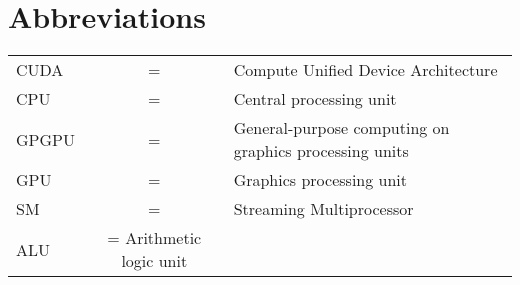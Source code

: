 
\section*{{\Huge Abbreviations}}
\vspace{1 cm}

\noindent
\begin{center}
\begin{tabular}{ l c l }
   CUDA & = & Compute Unified Device Architecture \\
   CPU & = & Central processing unit \\
   GPGPU & = & General-purpose computing on graphics processing units \\
   GPU & = & Graphics processing unit \\
   SM & = & Streaming Multiprocessor \\
   ALU & = Arithmetic logic unit \\
\end{tabular}
\end{center}

\cleardoublepage

\pagestyle{fancy}
\fancyhf{}
\renewcommand{\chaptermark}[1]{\markboth{\chaptername\ \thechapter.\ #1}{}}
\renewcommand{\sectionmark}[1]{\markright{\thesection\ #1}}
\renewcommand{\headrulewidth}{0.1ex}
\renewcommand{\footrulewidth}{0.1ex}
\fancyfoot[LE,RO]{\thepage}
\fancyhead[LE]{\leftmark}
\fancyhead[RO]{\rightmark}
\fancypagestyle{plain}{\fancyhf{}\fancyfoot[LE,RO]{\thepage}\renewcommand{\headrulewidth}{0ex}}

\setcounter{page}{1}
